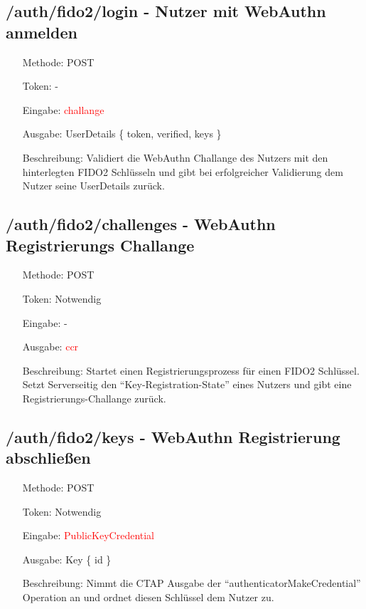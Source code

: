 \documentclass[journal]{IEEEtran}
\begin{document}
\subsection{/auth/fido2/login - Nutzer mit WebAuthn anmelden}

\begin{itemize}
	\setlength{\leftskip}{1.5cm}
	\setlength{\itemsep}{0pt}
	\item[Methode:] POST
	\item[Token:] -
	\item[Eingabe:] \textcolor{red}{challange}
	\item[Ausgabe:] UserDetails \{ token, verified, keys \}
	\item[Beschreibung:] Validiert die WebAuthn Challange des Nutzers mit den
		hinterlegten FIDO2 Schlüsseln und gibt bei erfolgreicher Validierung
		dem Nutzer seine UserDetails zurück.
\end{itemize}

\subsection{/auth/fido2/challenges - WebAuthn Registrierungs Challange}

\begin{itemize}
	\setlength{\leftskip}{1.5cm}
	\setlength{\itemsep}{0pt}
	\item[Methode:] POST
	\item[Token:] Notwendig
	\item[Eingabe:] -
	\item[Ausgabe:] \textcolor{red}{ccr}
	\item[Beschreibung:] Startet einen Registrierungsprozess für einen FIDO2
		Schlüssel. Setzt Serverseitig den ``Key-Registration-State'' eines
		Nutzers und gibt eine Registrierungs-Challange zurück.
\end{itemize}

\subsection{/auth/fido2/keys - WebAuthn Registrierung abschließen}

\begin{itemize}
	\setlength{\leftskip}{1.5cm}
	\setlength{\itemsep}{0pt}
	\item[Methode:] POST
	\item[Token:] Notwendig
	\item[Eingabe:] \textcolor{red}{PublicKeyCredential}
	\item[Ausgabe:] Key \{ id \}
	\item[Beschreibung:] Nimmt die CTAP Ausgabe der
		``authenticatorMakeCredential'' Operation an und ordnet diesen
		Schlüssel dem Nutzer zu.
\end{itemize}
\end{document}
